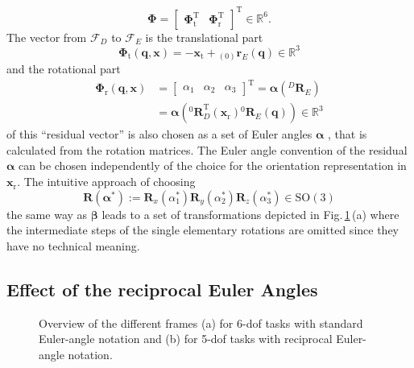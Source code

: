 \documentclass{svproc}
\newcommand{\bm}[1]{\boldsymbol{#1}}
\newcommand{\ortvek}[4]{{ }_{(#1)}{\boldsymbol{#2}}^{#3}_{#4} }
\newcommand{\rotmat}[2]{{{ }^{#1}\boldsymbol{R}}_{#2}}
\newcommand{\transp}[0]{{\mathrm{T}}}
\newcommand{\ks}[1]{{\mathcal{F}}_{#1}}
\begin{document}
%
\begin{equation}
\bm{\Phi}=\begin{bmatrix}
\bm{\Phi}_{\mathrm{t}}^\transp & \bm{\Phi}_{\mathrm{r}}^\transp
\end{bmatrix}^\transp \in {\mathbb{R}}^{6}.
\label{equ:Phi_def}
\end{equation}
%
The vector from $\ks{D}$ to $\ks{E}$ is the translational part 
%
\begin{equation}
\bm{\Phi}_{\mathrm{t}}(\bm{q},\bm{x}) = - \bm{x}_{\mathrm{t}} + \ortvek{0}{r}{}{E}(\bm{q}) \in {\mathbb{R}}^{3}
\label{equ:Phit_def}
\end{equation}
%
and the rotational part
%
\begin{align}
\bm{\Phi}_{\mathrm{r}}(\bm{q},\bm{x}) &= \begin{bmatrix}
\alpha_1  & \alpha_2 & \alpha_3
\end{bmatrix}^\transp
=\bm{\alpha}\left(\rotmat{D}{E}\right)\nonumber \\
&=\bm{\alpha}\left(\rotmat{0}{D}^\transp (\bm{x}_{\mathrm{r}})\rotmat{0}{E}(\bm{q})\right) \in {\mathbb{R}}^{3}
\label{equ:Phir_def}
\end{align}
%
of this ``residual vector'' is also chosen as a set of Euler angles $\bm{\alpha}$ \cite{GoldenbergBenFen1985}, that is calculated from the rotation matrices.
The Euler angle convention of the residual $\bm{\alpha}$ can be chosen independently of the choice for the orientation representation in  $\bm{x}_{\mathrm{r}}$.
The intuitive approach of choosing
%
\begin{equation}
\bm{R}(\bm{\alpha}^*) := \bm{R}_x(\alpha_1^*) \bm{R}_y(\alpha_2^*) \bm{R}_z(\alpha_3^*) \in \mathrm{SO(3)}
\label{equ:alpha_convention_xyz}
\end{equation}
%
the same way as $\bm{\beta}$ leads to a set of transformations depicted in Fig.\,\ref{fig:frames_5dof_6dof}\,(a) where the intermediate steps of the single elementary rotations are omitted since they have no technical meaning.
%

\subsection{Effect of the reciprocal Euler Angles}
\label{sec:RecEulAng_effect}


\begin{figure}[htb]
    
    \caption{Overview of the different frames (a) for 6-dof tasks with standard Euler-angle notation and (b) for 5-dof tasks with reciprocal Euler-angle notation.}
    \label{fig:frames_5dof_6dof}
\end{figure} 
\end{document}
